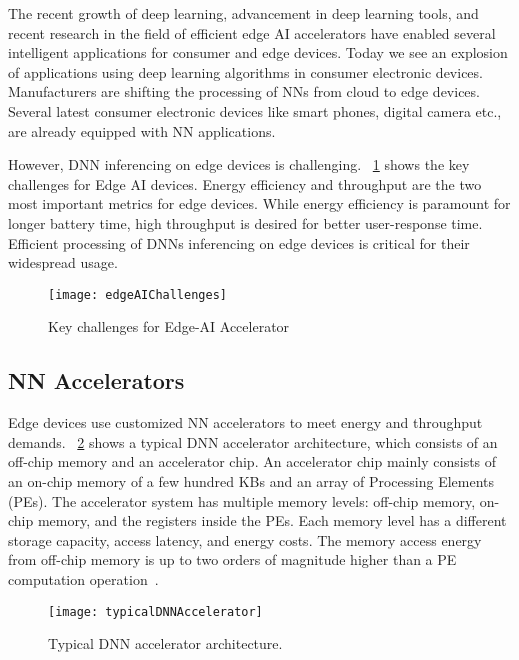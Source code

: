 The recent growth of deep learning, advancement in deep learning tools, and recent research in the field of efficient edge AI accelerators have enabled several intelligent applications for consumer and edge devices. Today we see an explosion of applications using deep learning algorithms in consumer electronic devices.
Manufacturers are shifting the processing of NNs from cloud to edge devices.  Several latest consumer electronic devices like smart phones, digital camera etc., are already equipped with NN applications. 

However, DNN inferencing on edge devices is challenging. \figurename{~\ref{fig:edgeAIChallenges}} shows the key challenges for Edge AI devices. Energy efficiency and throughput are the two most important metrics for edge devices. While energy efficiency is paramount for longer battery time, high throughput is desired for better user-response time. Efficient processing of DNNs inferencing on edge devices is critical for their widespread usage. 

\begin{figure}[!htb]
	\centering
	\captionsetup{font=sf}
	\texttt{[image: edgeAIChallenges]}
	\caption{Key challenges for Edge-AI Accelerator}
	\label{fig:edgeAIChallenges}
\end{figure}
\subsection{NN Accelerators}
Edge devices use customized NN accelerators to meet energy and throughput demands. \figurename{~\ref{fig:typicalDNNAccelerator}} shows a typical DNN accelerator architecture, which consists of an off-chip memory and an accelerator chip. An accelerator chip mainly consists of an on-chip memory of a few hundred KBs and an array of Processing Elements (PEs). The accelerator system has multiple memory levels: off-chip memory, on-chip memory, and the registers inside the PEs. Each memory level has a different storage capacity, access latency, and energy costs. The memory access energy from off-chip memory is up to two orders of magnitude higher than a PE computation operation~\cite{Chen2016EyerissAS}. 
\begin{figure}[!htb]
	\centering
	\captionsetup{font=sf}
	\texttt{[image: typicalDNNAccelerator]}
    \caption{Typical DNN accelerator architecture.}
   	\label{fig:typicalDNNAccelerator}
    \vspace{1.0em}
\end{figure}

